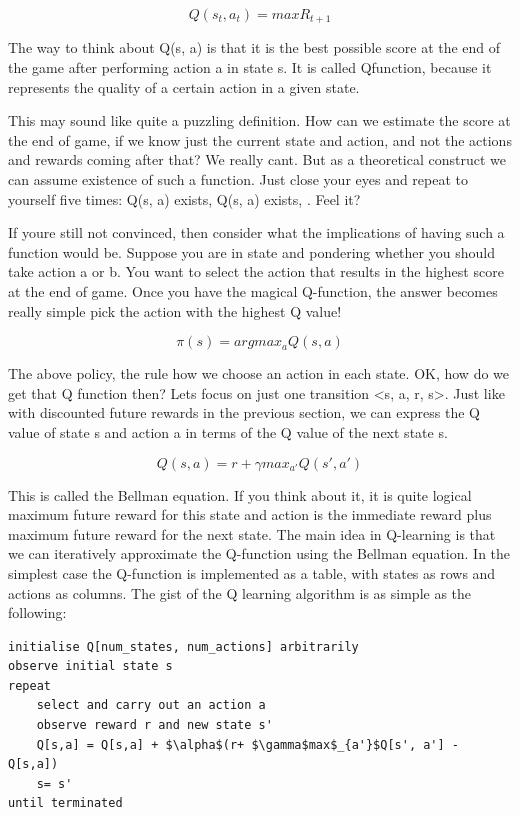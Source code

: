 \documentclass[a4paper,12pt]{report}
\begin{document}
				\[ Q(s_t, a_t) = max R_{t+1}\]

				The way to think about Q(s, a) is that it is the best possible score at the end of the game after performing action a in state s. It is called Qfunction, because it represents the quality of a certain action in a given state.

				This may sound like quite a puzzling definition. How can we estimate the score at the end of game, if we know just the current state and action, and not the actions and rewards coming after that? We really cant. But as a theoretical construct we can assume existence of such a function. Just close your eyes and repeat to yourself five times: Q(s, a) exists, Q(s, a) exists, . Feel it?

				If youre still not convinced, then consider what the implications of having such a function would be. Suppose you are in state and pondering whether you should take action a or b. You want to select the action that results in the highest score at the end of game. Once you have the magical Q-function, the answer becomes really simple pick the action with the highest Q value!

				\[ \pi(s) = argmax_a Q(s,a) \]

				The above policy, the rule how we choose an action in each state.
				OK, how do we get that Q function then? Lets focus on just one transition <s, a, r, s>. Just like with discounted future rewards in the previous section, we can express the Q value of state s and action a in terms of the Q value of the next state s.

				\[ Q(s,a) = r + {\gamma}max_{a'}Q(s',a')\]

				This is called the Bellman equation. If you think about it, it is quite logical maximum future reward for this state and action is the immediate reward plus maximum future reward for the next state.
				The main idea in Q-learning is that we can iteratively approximate the Q-function using the Bellman equation. In the simplest case the Q-function is implemented as a table, with states as rows and actions as columns. The gist of the Q learning algorithm is as simple as the following:

				\begin{lstlisting}[mathescape=true, morekeywords={repeat, until}]
initialise Q[num_states, num_actions] arbitrarily
observe initial state s
repeat
	select and carry out an action a
	observe reward r and new state s'
	Q[s,a] = Q[s,a] + $\alpha$(r+ $\gamma$max$_{a'}$Q[s', a'] - Q[s,a])
	s= s'
until terminated
				\end{lstlisting}
\end{document}
